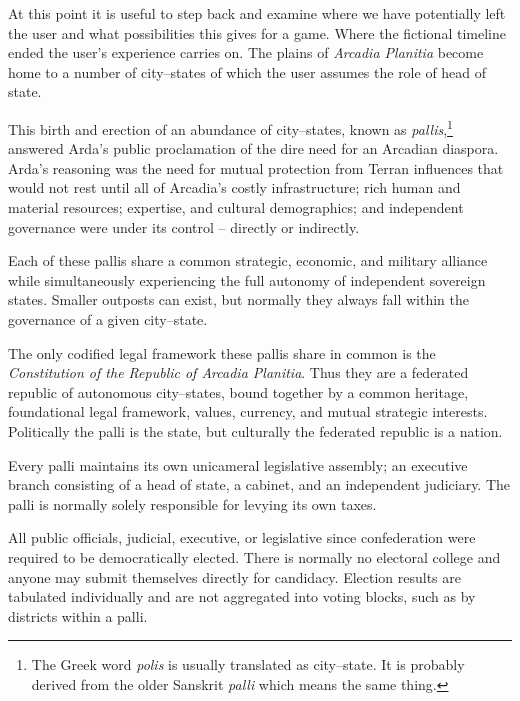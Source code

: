 

At this point it is useful to step back and examine where we have potentially left the user and what possibilities this gives for a game. Where the fictional timeline ended the user's experience carries on. The plains of {\it Arcadia Planitia} become home to a number of city--states of which the user assumes the role of head of state.

This birth and erection of an abundance of city--states, known as {\it pallis},\footnote{The Greek word {\it polis} is usually translated as city--state. It is probably derived from the older Sanskrit {\it palli} which means the same thing.} answered Arda's public proclamation of the dire need for an Arcadian diaspora. Arda's reasoning was the need for mutual protection from Terran influences that would not rest until all of Arcadia's costly infrastructure; rich human and material resources; expertise, and cultural demographics; and independent governance were under its control -- directly or indirectly.

Each of these pallis share a common strategic, economic, and military alliance while simultaneously experiencing the full autonomy of independent sovereign states. Smaller outposts can exist, but normally they always fall within the governance of a given city--state.

The only codified legal framework these pallis share in common is the {\it Constitution of the Republic of Arcadia Planitia}. Thus they are a federated republic of autonomous city--states, bound together by a common heritage, foundational legal framework, values, currency, and mutual strategic interests. Politically the palli is the state, but culturally the federated republic is a nation.

Every palli maintains its own unicameral legislative assembly; an executive branch consisting of a head of state, a cabinet, and an independent judiciary. The palli is normally solely responsible for levying its own taxes.

All public officials, judicial, executive, or legislative since confederation were required to be democratically elected. There is normally no electoral college and anyone may submit themselves directly for candidacy. Election results are tabulated individually and are not aggregated into voting blocks, such as by districts within a palli.

